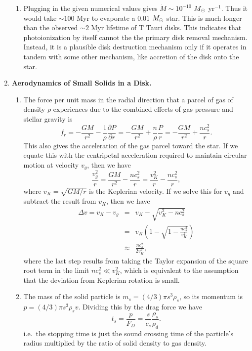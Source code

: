 \begin{enumerate}
\begin{enumerate}
\item Plugging in the given numerical values gives $\dot{M} \sim 10^{-10}$ $M_{\odot}$ yr$^{-1}$. Thus it would take $\sim 100$ Myr to evaporate a $0.01$ $M_{\odot}$ star. This is much longer than the observed $\sim 2$ Myr lifetime of T Tauri disks. This indicates that photoionization by itself cannot the the primary disk removal mechanism. Instead, it is a plausible disk destruction mechanism only if it operates in tandem with some other mechanism, like accretion of the disk onto the star.

\end{enumerate}

\item {\bf Aerodynamics of Small Solids in a Disk.}

\begin{enumerate}

\item The force per unit mass in the radial direction that a parcel of gas of density $\rho$ experiences due to the combined effects of gas pressure and stellar gravity is
\begin{displaymath}
f_r = -\frac{G M}{r^2} - \frac{1}{\rho}\frac{\partial P}{\partial r} = -\frac{GM}{r^2} + \frac{n}{\rho}\frac{P}{r} = -\frac{GM}{r^2} + \frac{n c_s^2}{r}.
\end{displaymath}
This also gives the acceleration of the gas parcel toward the star. If we equate this with the centripetal acceleration required to maintain circular motion at velocity $v_g$, then we have
\begin{displaymath}
\frac{v_g^2}{r} = \frac{GM}{r^2} - \frac{n c_s^2}{r} = \frac{v_K^2}{r} - \frac{n c_s^2}{r},
\end{displaymath}
where $v_K = \sqrt{GM/r}$ is the Keplerian velocity. If we solve this for $v_g$ and subtract the result from $v_K$, then we have
\begin{eqnarray*}
\Delta v = v_K - v_g & = & v_K - \sqrt{v_K^2 - n c_s^2} \\
& = & v_K \left(1 - \sqrt{1 - \frac{n c_s^2}{v_K^2}}\right) \\
& \approx & \frac{n c_s^2}{2 v_K^2},
\end{eqnarray*}
where the last step results from taking the Taylor expansion of the square root term in the limit $nc_s^2 \ll v_K^2$, which is equivalent to the assumption that the deviation from Keplerian rotation is small.

\item The mass of the solid particle is $m_s = (4/3)\pi s^3 \rho_s$, so its momentum is $p = (4/3)\pi s^3 \rho_s v$. Dividing this by the drag force we have
\begin{displaymath}
t_s = \frac{p}{F_D} = \frac{s}{c_s}\frac{\rho_s}{\rho_d}.
\end{displaymath}
i.e.\ the stopping time is just the sound crossing time of the particle's radius multiplied by the ratio of solid density to gas density.


\end{enumerate}
\end{enumerate}
